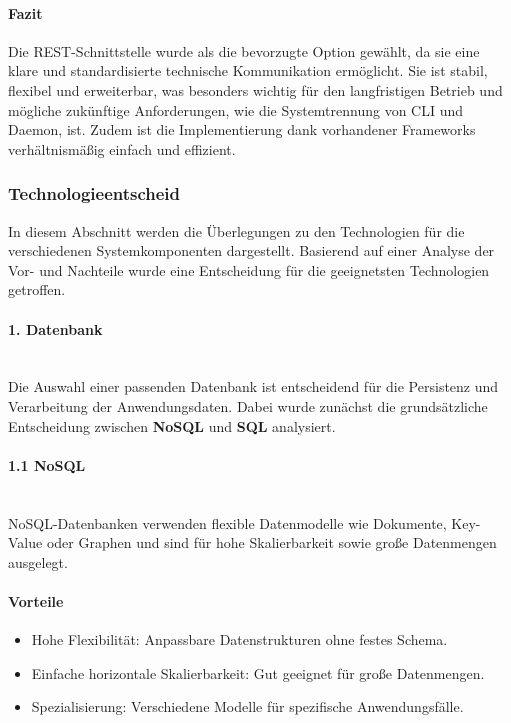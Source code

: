 \documentclass[a4paper,12pt]{report}
\begin{document}
    \paragraph*{Fazit}
    Die REST-Schnittstelle wurde als die bevorzugte Option gewählt, da sie eine klare und standardisierte technische Kommunikation ermöglicht.
    Sie ist stabil, flexibel und erweiterbar, was besonders wichtig für den langfristigen Betrieb und mögliche zukünftige Anforderungen, wie die Systemtrennung von CLI und Daemon, ist.
    Zudem ist die Implementierung dank vorhandener Frameworks verhältnismäßig einfach und effizient.
    \clearpage

    \subsubsection{Technologieentscheid}\label{subsubsec:technologieentscheid}
    In diesem Abschnitt werden die Überlegungen zu den Technologien für die verschiedenen Systemkomponenten dargestellt.
    Basierend auf einer Analyse der Vor- und Nachteile wurde eine Entscheidung für die geeignetsten Technologien getroffen.

    \paragraph*{1. Datenbank}\mbox{}\\
    Die Auswahl einer passenden Datenbank ist entscheidend für die Persistenz und Verarbeitung der Anwendungsdaten.
    Dabei wurde zunächst die grundsätzliche Entscheidung zwischen \textbf{NoSQL} und \textbf{SQL} analysiert.

    \paragraph*{1.1 NoSQL}\mbox{}\\
    NoSQL-Datenbanken verwenden flexible Datenmodelle wie Dokumente, Key-Value oder Graphen und sind für hohe Skalierbarkeit sowie große Datenmengen ausgelegt.

    \paragraph*{Vorteile}
    \begin{itemize}
        \item Hohe Flexibilität: Anpassbare Datenstrukturen ohne festes Schema.
        \item Einfache horizontale Skalierbarkeit: Gut geeignet für große Datenmengen.
        \item Spezialisierung: Verschiedene Modelle für spezifische Anwendungsfälle.
    \end{itemize}
\end{document}
